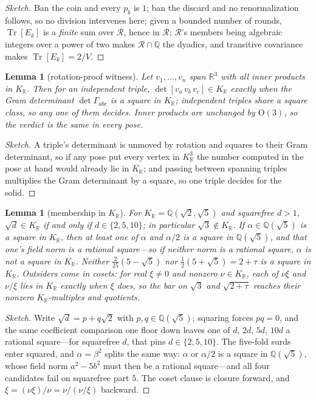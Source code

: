 \documentclass[11pt,a4paper]{article}
\DeclareMathOperator{\Tr}{Tr}
\newcommand{\R}{\mathbb{R}}
\newcommand{\phig}{\tau}      %
\newenvironment{sketch}{\renewcommand{\qedsymbol}{}\begin{proof}[Sketch]}{\end{proof}}
\newtheorem{lemma}[theorem]{Lemma}
\begin{document}
\begin{sketch}
Ban the coin and every $p_b$ is $1$; ban the discard and no renormalization follows, so no division intervenes here; given a bounded number of rounds, $\Tr[E_k]$ is a \textit{finite} sum over $\mathcal{R}$, hence in $\mathcal{R}$; $\mathcal{R}$'s members being algebraic integers over a power of two makes $\mathcal{R} \cap \mathbb{Q}$ the dyadics, and transitive covariance makes $\Tr[E_k] = 2/V$.
\end{sketch}

\begin{lemma}[rotation-proof witness] \label{lem:witness}
Let $v_1,\dots,v_n$ span $\R^3$ with all inner products in $K_\R$. Then for an independent triple, $\det[v_a\,v_b\,v_c] \in K_\R$ exactly when the Gram determinant $\det\Gamma_{abc}$ is a square in $K_\R$; independent triples share a square class, so any one of them decides. Inner products are unchanged by $\mathrm{O}(3)$, so the verdict is the same in every pose.
\end{lemma}

\begin{sketch}
A triple's determinant is unmoved by rotation and squares to their Gram determinant, so if any pose put every vertex in $K_\R^3$ the number computed in the pose at hand would already lie in $K_\R$; and passing between spanning triples multiplies the Gram determinant by a square, so one triple decides for the solid.
\end{sketch}

\begin{lemma}[membership in $K_\R$] \label{lem:membership}
For $K_\R = \mathbb{Q}(\sqrt{2},\sqrt{5})$ and squarefree $d > 1$, $\sqrt{d} \in K_\R$ if and only if $d \in \{2,5,10\}$; in particular $\sqrt{3} \notin K_\R$. If $\alpha \in \mathbb{Q}(\sqrt{5})$ is a square in $K_\R$, then at least one of $\alpha$ and $\alpha/2$ is a square in $\mathbb{Q}(\sqrt{5})$, and that one's field norm is a rational square---so if neither norm is a rational square, $\alpha$ is not a square in $K_\R$. Neither $\tfrac{2}{25}(5-\sqrt{5})$ nor $\tfrac{1}{2}(5+\sqrt{5}) = 2 + \phig$ is a square in $K_\R$. Outsiders come in cosets: for real $\xi \neq 0$ and nonzero $\nu \in K_\R$, each of $\nu\xi$ and $\nu/\xi$ lies in $K_\R$ exactly when $\xi$ does, so the bar on $\sqrt{3}$ and $\sqrt{2+\phig}$ reaches their nonzero $K_\R$-multiples and quotients.
\end{lemma}

\begin{sketch}
Write $\sqrt{d} = p + q\sqrt{2}$ with $p, q \in \mathbb{Q}(\sqrt{5})$; squaring forces $pq = 0$, and the same coefficient comparison one floor down leaves one of $d$, $2d$, $5d$, $10d$ a rational square---for squarefree $d$, that pins $d \in \{2, 5, 10\}$. The five-fold surds enter squared, and $\alpha = \beta^2$ splits the same way: $\alpha$ or $\alpha/2$ is a square in $\mathbb{Q}(\sqrt{5})$, whose field norm $a^2 - 5b^2$ must then be a rational square---and all four candidates fail on squarefree part $5$. The coset clause is closure forward, and $\xi = (\nu\xi)/\nu = \nu/(\nu/\xi)$ backward.
\end{sketch}
\end{document}
